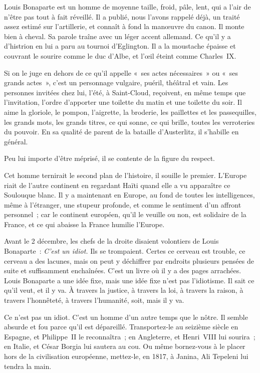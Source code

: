 \documentclass[french,twoside]{book} %
\begin{document}
\noindent Louis Bonaparte est un homme de moyenne taille, froid, pâle, lent, qui a l’air de n’être pas tout à fait réveillé. Il a publié, nous l’avons rappelé déjà, un traité assez estimé sur l’artillerie, et connaît à fond la manœuvre du canon. Il monte bien à cheval. Sa parole traîne avec un léger accent allemand. Ce qu’il y a d’histrion en lui a paru au tournoi d’Eglington. Il a la moustache épaisse et couvrant le sourire comme le duc d’Albe, et l’œil éteint comme Charles IX.\par
Si on le juge en dehors de ce qu’il appelle « ses actes nécessaires » ou « ses grands actes », c’est un personnage vulgaire, puéril, théâtral et vain. Les personnes invitées chez lui, l’été, à Saint-Cloud, reçoivent, en même temps que l’invitation, l’ordre d’apporter une toilette du matin et une toilette du soir. Il aime la gloriole, le pompon, l’aigrette, la broderie, les paillettes et les passequilles, les grands mots, les grands titres, ce qui sonne, ce qui brille, toutes les verroteries du pouvoir. En sa qualité de parent de la bataille d’Austerlitz, il s’habille en général.\par
Peu lui importe d’être méprisé, il se contente de la figure du respect.\par
Cet homme ternirait le second plan de l’histoire, il souille le premier. L’Europe riait de l’autre continent en regardant Haïti quand elle a vu apparaître ce Soulouque blanc. Il y a maintenant en Europe, au fond de toutes les intelligences, même à l’étranger, une stupeur profonde, et comme le sentiment d’un affront personnel ; car le continent européen, qu’il le veuille ou non, est solidaire de la France, et ce qui abaisse la France humilie l’Europe.\par
Avant le 2 décembre, les chefs de la droite disaient volontiers de Louis Bonaparte : \emph{C’est un idiot.} Ils se trompaient. Certes ce cerveau est trouble, ce cerveau a des lacunes, mais on peut y déchiffrer par endroits plusieurs pensées de suite et suffisamment enchaînées. C’est un livre où il y a des pages arrachées. Louis Bonaparte a une idée fixe, mais une idée fixe n’est pas l’idiotisme. Il sait ce qu’il veut, et il y va. À travers la justice, à travers la loi, à travers la raison, à travers l’honnêteté, à travers l’humanité, soit, mais il y va.\par
Ce n’est pas un idiot. C’est un homme d’un autre temps que le nôtre. Il semble absurde et fou parce qu’il est dépareillé. Transportez-le au seizième siècle en Espagne, et Philippe II le reconnaîtra ; en Angleterre, et Henri VIII lui sourira ; en Italie, et César Borgia lui sautera au cou. Ou même bornez-vous à le placer hors de la civilisation européenne, mettez-le, en 1817, à Janina, Ali Tepeleni lui tendra la main.\par
\end{document}
